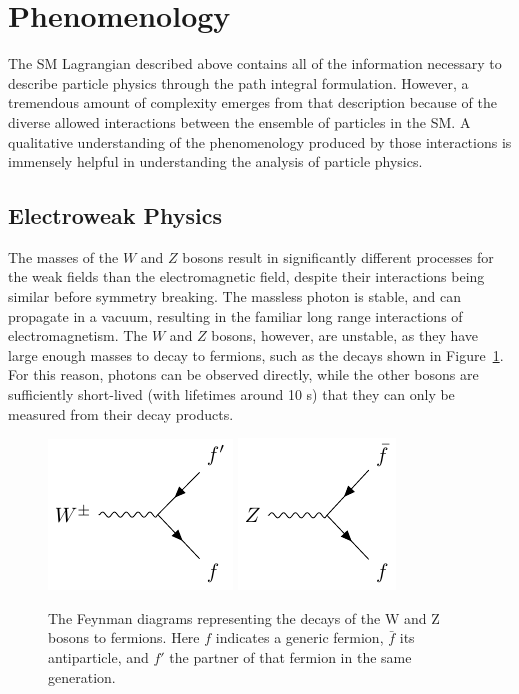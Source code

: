 \section{Phenomenology}

The \ac{SM} Lagrangian described above contains all of the information necessary to describe particle physics through the path integral formulation. 
However, a tremendous amount of complexity emerges from that description because of the diverse allowed interactions between the ensemble of particles in the \ac{SM}.
A qualitative understanding of the phenomenology produced by those interactions is immensely helpful in understanding the analysis of particle physics.

\subsection{Electroweak Physics}

The masses of the $W$ and $Z$ bosons result in significantly different processes for the weak fields than the electromagnetic field, despite their interactions being similar before symmetry breaking.
The massless photon is stable, and can propagate in a vacuum, resulting in the familiar long range interactions of electromagnetism.
The $W$ and $Z$ bosons, however, are unstable, as they have large enough masses to decay to fermions, such as the decays shown in Figure~\ref{fig:feyn_weak}.
For this reason, photons can be observed directly, while the other bosons are sufficiently short-lived (with lifetimes around 10 s) that they can only be measured from their decay products.

\begin{figure}
\includegraphics[width=\halffig]{figures/feyn_wdecay.pdf}
\includegraphics[width=\halffig]{figures/feyn_zdecay.pdf}\\
\caption{The Feynman diagrams representing the decays of the W and Z bosons to fermions. Here $f$ indicates a generic fermion, $\bar{f}$ its antiparticle, and $f'$ the partner of that fermion in the same generation.}
\label{fig:feyn_weak}
\end{figure}


